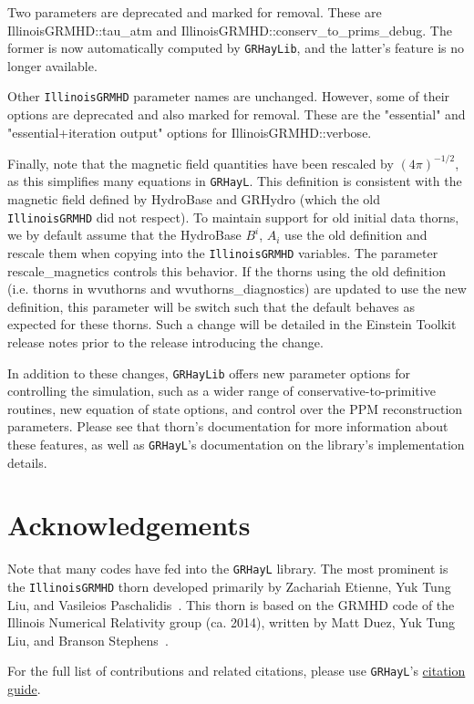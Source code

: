 \documentclass{article}
\newcommand{\grhayl}{\texttt{GRHayL}\xspace}
\newcommand{\glib}{\texttt{GRHayLib}\xspace}
\newcommand{\igm}{\texttt{IllinoisGRMHD}\xspace}
\begin{document}
Two parameters are deprecated and marked for removal. These are
IllinoisGRMHD::tau\_atm and IllinoisGRMHD::conserv\_to\_prims\_debug. The former
is now automatically computed by \glib, and the latter's feature is no
longer available.

Other \igm parameter names are unchanged. However, some of their options
are deprecated and also marked for removal. These are the "essential" and
"essential+iteration output" options for IllinoisGRMHD::verbose.

Finally, note that the magnetic field quantities have been rescaled by
$\left(4\pi\right)^{-1/2}$, as this simplifies many equations in \grhayl.
This definition is consistent with the magnetic field defined by HydroBase
and GRHydro (which the old \igm did not respect). To maintain support for
old initial data thorns, we by default assume that the HydroBase $B^i$,
$A_i$ use the old definition and rescale them when copying into the \igm
variables. The parameter rescale\_magnetics controls this behavior. If
the thorns using the old definition (i.e. thorns in wvuthorns and
wvuthorns\_diagnostics) are updated to use the new definition, this parameter
will be switch such that the default behaves as expected for these thorns.
Such a change will be detailed in the Einstein Toolkit release notes prior
to the release introducing the change.

In addition to these changes, \glib offers new parameter options for
controlling the simulation, such as a wider range of conservative-to-primitive
routines, new equation of state options, and control over the PPM reconstruction
parameters. Please see that thorn's documentation for more information about these
features, as well as \grhayl's documentation on the library's implementation
details.

\section{Acknowledgements}

Note that many codes have fed into the \grhayl library. The most prominent is
the \igm thorn developed primarily by Zachariah Etienne, Yuk Tung Liu, and
Vasileios Paschalidis~\cite{WVUThorns_IllinoisGRMHD_Etienne:2015cea}. This
thorn is based on the GRMHD code of the Illinois Numerical Relativity group
(ca. 2014), written by Matt Duez, Yuk Tung Liu, and Branson Stephens~.

For the full list of contributions and related citations, please use \grhayl's
\href{https://github.com/GRHayL/GRHayL/wiki/Citation-and-License-Guide}{citation guide}.
\end{document}
